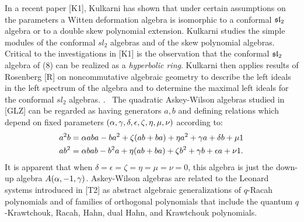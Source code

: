       \m
      In a recent paper [K1], Kulkarni has shown that under certain
      assumptions on the parameters a Witten deformation algebra is isomorphic to
      a conformal $\frak s\frak l_2$ algebra or to a double skew polynomial extension.
      Kulkarni studies the simple modules of
      the conformal $sl_2$ algebras and of the skew polynomial
      algebras.  Critical to the investigations in [K1] is the
      observation that the conformal $\frak s\frak l_2$ algebra of (8) can be realized as a 
      {\it hyperbolic
      ring}.  Kulkarni then applies results of Rosenberg [R]
      on noncommutative algebraic geometry 
      to describe the left ideals in the left spectrum of the algebra and to
      determine the maximal left ideals for the conformal $sl_2$ algebras.
      \m 
      . \ The quadratic Askey-Wilson algebras studied in
      [GLZ] can be regarded as having generators $a,b$ and defining relations
      which depend on fixed parameters $(\alpha,\gamma,\delta,\epsilon, \zeta,\eta,\mu,\nu)$
      according to:
      $$\aligned a^2b & = \a aba - ba^2 + \zeta(ab+ba) +  \eta a^2 + \gamma a + \delta b
      + \mu 1 \\
      ab^2 & = \a bab - b^2a + \eta(ab+ba) +\zeta b^2 + \gamma b + \epsilon a
      + \nu 1. \\ \endaligned$$
      \n It is apparent that when $\delta=\epsilon=\zeta=\eta=\mu=\nu = 0$, this
      algebra is just the down-up algebra $A(\alpha,-1,\gamma)$. Askey-Wilson algebras
      are related to the Leonard systems introduced in [T2] as abstract 
      algebraic generalizations
      of $q$-Racah polynomials and of families of orthogonal polynomials that
      include the quantum $q$-Krawtchouk, Racah, Hahn, dual Hahn, and
      Krawtchouk polynomials.   
        
